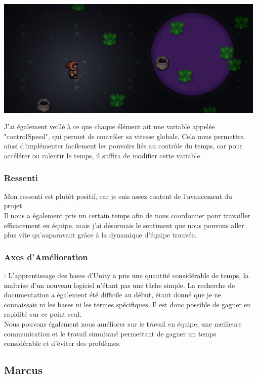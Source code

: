 \documentclass[a4page, 14pt]{extarticle}
\begin{document}
{    \begin{center}
        \includegraphics[width=1\textwidth]{images/PoisonZone.png}
    \end{center}
J'ai également veillé à ce que chaque élément ait une variable appelée "controlSpeed", qui permet de contrôler sa vitesse globale. Cela nous permettra ainsi d'implémenter facilement les pouvoirs liés au contrôle du temps, car pour accélérer ou ralentir le temps, il suffira de modifier cette variable.
}
    \subsubsection{Ressenti} {
Mon ressenti est plutôt positif, car je suis assez content de l'avancement du projet. \\ Il nous a également pris un certain temps afin de nous coordonner pour travailler efficacement en équipe, mais j'ai désormais le sentiment que nous pouvons aller plus vite qu'auparavant grâce à la dynamique d'équipe trouvée.
  }
\subsubsection{Axes d'Amélioration}{: L'apprentissage des bases d'Unity a pris une quantité considérable de temps, la maîtrise d'un nouveau logiciel n'étant pas une tâche simple. La recherche de documentation a également été difficile au début, étant donné que je ne connaissais ni les bases ni les termes spécifiques. Il est donc possible de gagner en rapidité sur ce point seul. \\ Nous pouvons également nous améliorer sur le travail en équipe, une meilleure communication et le travail simultané permettant de gagner un temps considérable et d'éviter des problèmes.
}
    \subsection{Marcus}
\end{document}
